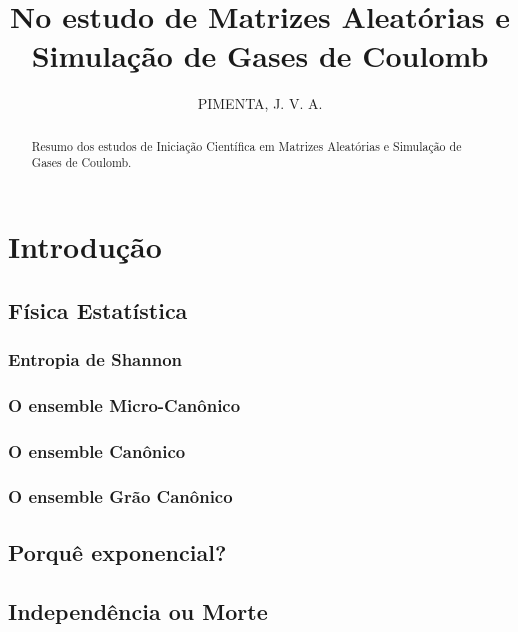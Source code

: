 \documentclass[11pt,oneside,a4paper]{report}
\title{
	{No estudo de Matrizes Aleatórias e Simulação de Gases de Coulomb}\\
}
\author{PIMENTA, J. V. A.}
\begin{document}
\maketitle

\begin{abstract}
	Resumo dos estudos de Iniciação Científica em Matrizes Aleatórias e Simulação de Gases de Coulomb.
\end{abstract}

\tableofcontents

\chapter{Introdução}


\section{Física Estatística}


\subsection{Entropia de Shannon}


\subsection{O ensemble Micro-Canônico}


\subsection{O ensemble Canônico}


\subsection{O ensemble Grão Canônico}


\section{Porquê exponencial?}


\section{Independência ou Morte}

\end{document}
